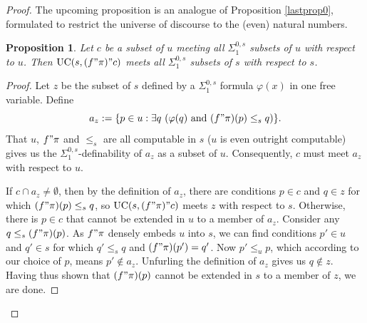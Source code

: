 \documentclass[12pt, twoside]{memoir}
\numberwithin{equation}{section}
\newtheorem{prop}[thm]{Proposition}
\theoremstyle{definition}
\theoremstyle{remark}
\theoremstyle{definition}
\theoremstyle{definition}
\theoremstyle{definition}
\theoremstyle{remark}
\begin{document}
\begin{proof}
The upcoming proposition is an analogue of Proposition \ref{lastprop0}, formulated to restrict the universe of discourse to the (even) natural numbers. 

\begin{prop}\label{lastprop}
Let $c$ be a subset of $u$ meeting all $\Sigma^{0, s}_1$ subsets of $u$ with respect to $u$. Then $\mathrm{UC}(s, (f" \pi)" c)$ meets all $\Sigma^{0, s}_1$ subsets of $s$ with respect to $s$.
\end{prop}

\begin{proof}
Let $z$ be the subset of $s$ defined by a $\Sigma^{0, s}_1$ formula $\varphi(x)$ in one free variable. Define $$a_z := \{p \in u : \exists q \ (\varphi(q) \text{ and } (f" \pi)(p) \leq_s q)\} \text{.}$$ That $u$, $f" \pi$ and $\leq_s$ are all computable in $s$ ($u$ is even outright computable) gives us the $\Sigma^{0, s}_1$-definability of $a_z$ as a subset of $u$. Consequently, $c$ must meet $a_z$ with respect to $u$.

If $c \cap a_z \neq \emptyset$, then by the definition of $a_z$, there are conditions $p \in c$ and $q \in z$ for which $(f" \pi)(p) \leq_s q$, so $\mathrm{UC}(s, (f" \pi)" c)$ meets $z$ with respect to $s$. Otherwise, there is $p \in c$ that cannot be extended in $u$ to a member of $a_z$. Consider any $q \leq_s (f" \pi)(p)$. As $f" \pi$ densely embeds $u$ into $s$, we can find conditions $p' \in u$ and $q' \in s$ for which $q' \leq_s q$ and $(f" \pi)(p') = q'$. Now $p' \leq_u p$, which according to our choice of $p$, means $p' \not\in a_z$. Unfurling the definition of $a_z$ gives us $q \not\in z$. Having thus shown that $(f" \pi)(p)$ cannot be extended in $s$ to a member of $z$, we are done.
\end{proof}


\end{proof}
\end{document}
